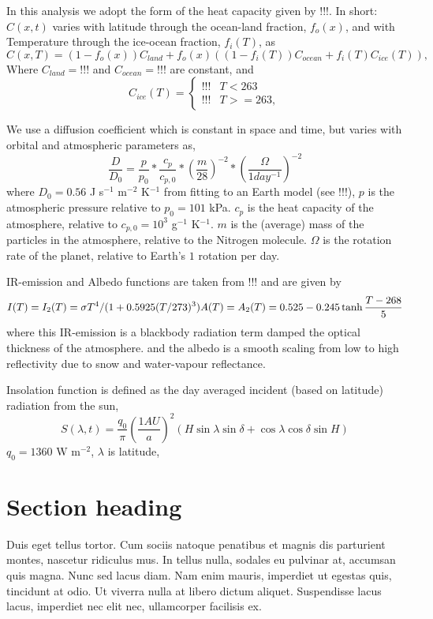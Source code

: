 \documentclass[12pt, onecolumn]{revtex4-2}    %
\begin{document}
In this analysis we adopt the form of the heat capacity given by !!!.
In short: $C(x, t)$ varies with latitude through the ocean-land fraction, $f_o(x)$, and with Temperature through the ice-ocean fraction, $f_i(T)$, as
$$
    C(x, T) = (1 - f_o(x)) C_{land} + f_o(x) ((1-f_i(T)) C_{ocean} + f_i(T) C_{ice}(T)),
$$
Where $C_{land} = !!!$ and $C_{ocean} = !!!$ are constant, and
$$
    C_{ice}(T) =
    \begin{cases}
        !!! & T < 263   \\
        !!! & T >= 263,
    \end{cases}
$$

We use a diffusion coefficient which is constant in space and time, but varies with orbital and atmospheric parameters as,
$$
    \frac{D}{D_0} = \frac{p}{p_0} * \frac{c_p}{c_{p,0}} * \left(\frac{m}{28}\right)^{-2} * \left(\frac{\Omega}{1 day^{-1}}\right)^{-2}
$$
where $D_0 = 0.56$ J s$^{-1}$ m$^{-2}$ K$^{-1}$ from fitting to an Earth model (see !!!),
$p$ is the atmospheric pressure relative to $p_0 = 101$ kPa.
$c_p$ is the heat capacity of the atmosphere, relative to $c_{p,0} = 10^3$ g$^{-1}$ K$^{-1}$.
$m$ is the (average) mass of the particles in the atmosphere, relative to the Nitrogen molecule.
$\Omega$ is the rotation rate of the planet, relative to Earth's $1$ rotation per day.

IR-emission and Albedo functions are taken from !!! and are given by
$$
    I(T) = I_2(T) = \sigma T^4 / (1 + 0.5925 (T/273) ^ 3) \\
    A(T) = A_2(T) = 0.525 - 0.245 \tanh{\frac{T-268}{5}}
$$
where this IR-emission is a blackbody radiation term damped the optical thickness of the atmosphere.
and the albedo is a smooth scaling from low to high reflectivity due to snow and water-vapour reflectance.

Insolation function is defined as the day averaged incident (based on latitude) radiation from the sun,
$$
    S(\lambda, t) = \frac{q_0}{\pi} \left(\frac{1 AU}{a}\right)^2 (H \sin{\lambda} \sin{\delta} + \cos{\lambda} \cos{\delta} \sin{H})
$$
$q_0 = 1360$ W m$^{-2}$, $\lambda$ is latitude,

\section{Section heading}

Duis eget tellus tortor. Cum sociis natoque penatibus et magnis dis parturient montes, nascetur ridiculus mus. In tellus nulla, sodales eu pulvinar at, accumsan quis magna. Nunc sed lacus diam. Nam enim mauris, imperdiet ut egestas quis, tincidunt at odio. Ut viverra nulla at libero dictum aliquet. Suspendisse lacus lacus, imperdiet nec elit nec, ullamcorper facilisis ex.
\end{document}
